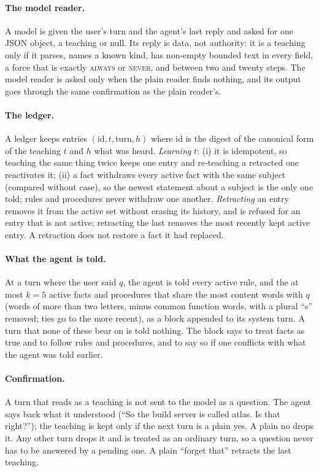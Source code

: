 \paragraph{The model reader.}
A model is given the user's turn and the agent's last reply and asked for one JSON object, a teaching or null. Its reply is data, not
authority: it is a teaching only if it parses, names a known kind, has non-empty bounded text in every field, a force that is exactly \textsc{always}
or \textsc{never}, and between two and twenty steps. The model reader is asked only when the plain reader finds nothing, and its output goes through the same confirmation as the plain
reader's.

\paragraph{The ledger.}
A ledger keeps entries $(\mathrm{id},t,\mathrm{turn},h)$ where $\mathrm{id}$ is the digest of the canonical form of the teaching $t$ and $h$ what was heard.
\emph{Learning} $t$: (i) it is idempotent, so teaching the same thing twice keeps one entry and re-teaching a retracted one reactivates it;
(ii) a fact withdraws every active fact with the same subject (compared without case), so the newest statement about a subject is the only one told; rules and
procedures never withdraw one another. \emph{Retracting} an entry removes it from the active set without erasing its history, and is refused for an entry that is not active;
retracting the last removes the most recently kept active entry. A retraction does not restore a fact it had replaced.

\paragraph{What the agent is told.}
At a turn where the user said $q$, the agent is told every active rule, and the at most $k=5$ active facts and procedures that share the most content words with $q$ (words of
more than two letters, minus common function words, with a plural ``s'' removed; ties go to the more recent), as a block appended to its system turn. A turn that none of these bear on is told nothing.
The block says to treat facts as true and to follow rules and procedures, and to say so if one conflicts with what the agent was told earlier.

\paragraph{Confirmation.}
A turn that reads as a teaching is not sent to the model as a question. The agent says back what it understood (``So the build server is called atlas. Is that right?'');
the teaching is kept only if the next turn is a plain yes. A plain no drops it. Any other turn drops it and is treated as an ordinary turn, so a question never has to be answered by a pending one.
A plain ``forget that'' retracts the last teaching.

